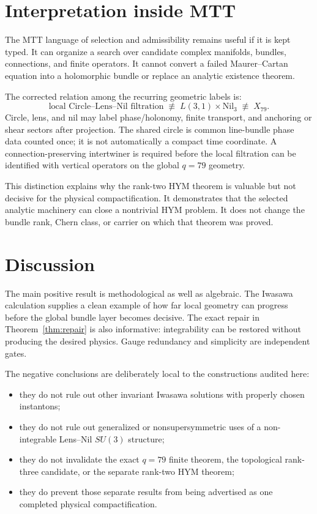 \documentclass[11pt]{article}
\theoremstyle{definition}
\theoremstyle{remark}
\begin{document}
\section{Interpretation inside MTT}
\label{sec:mtt}

The MTT language of selection and admissibility remains useful if it is kept
typed.  It can organize a search over candidate complex manifolds, bundles,
connections, and finite operators.  It cannot convert a failed
Maurer--Cartan equation into a holomorphic bundle or replace an analytic
existence theorem.

The corrected relation among the recurring geometric labels is:
\[
\text{local Circle--Lens--Nil filtration}
\;\not\equiv\;
L(3,1)\times\mathrm{Nil}_3
\;\not\equiv\;
X_{79}.
\]
Circle, lens, and nil may label phase/holonomy, finite transport, and
anchoring or shear sectors after projection.  The shared circle is common
line-bundle phase data counted once; it is not automatically a compact time
coordinate.  A connection-preserving intertwiner is required before the local
filtration can be identified with vertical operators on the global \(q=79\)
geometry.

This distinction explains why the rank-two HYM theorem is valuable but not
decisive for the physical compactification.  It demonstrates that the
selected analytic machinery can close a nontrivial HYM problem.  It does not
change the bundle rank, Chern class, or carrier on which that theorem was
proved.

\section{Discussion}

The main positive result is methodological as well as algebraic.  The
Iwasawa calculation supplies a clean example of how far local geometry can
progress before the global bundle layer becomes decisive.  The exact repair
in Theorem~\ref{thm:repair} is also informative: integrability can be restored
without producing the desired physics.  Gauge redundancy and simplicity are
independent gates.

The negative conclusions are deliberately local to the constructions audited
here:
\begin{itemize}[leftmargin=1.5em]
\item they do not rule out other invariant Iwasawa solutions with properly
      chosen instantons;
\item they do not rule out generalized or nonsupersymmetric uses of a
      non-integrable Lens--Nil \(SU(3)\) structure;
\item they do not invalidate the exact \(q=79\) finite theorem, the topological
      rank-three candidate, or the separate rank-two HYM theorem;
\item they do prevent those separate results from being advertised as one
      completed physical compactification.
\end{itemize}
\end{document}

